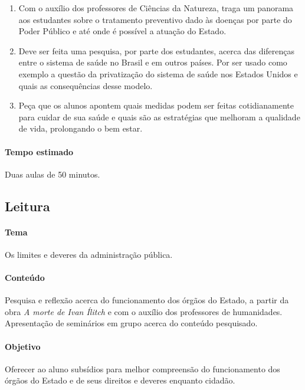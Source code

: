 \documentclass[12pt]{extarticle}
\begin{document}
\begin{enumerate}

\item Com o auxílio dos professores de Ciências da Natureza, traga
um panorama aos estudantes sobre o tratamento preventivo dado às doenças
por parte do Poder Público e até onde é possível a atuação do Estado.

\item Deve ser feita uma pesquisa, por parte dos estudantes,
acerca das diferenças entre o sistema de saúde no Brasil e em outros países.
Por ser usado como exemplo a questão da privatização do sistema de saúde nos Estados Unidos
e quais as consequências desse modelo.

\item Peça que os alunos apontem quais medidas podem ser feitas cotidianamente
para cuidar de sua saúde e quais são as estratégias que melhoram a qualidade de vida, 
prolongando o bem estar.

\end{enumerate}

\paragraph{Tempo estimado} Duas aulas de 50 minutos.


\subsection{Leitura}

\paragraph{Tema} Os limites e deveres da administração pública.

\paragraph{Conteúdo} Pesquisa e reflexão acerca do funcionamento dos órgãos do Estado,
a partir da obra \emph{A morte de Ivan Ílitch} e com o auxílio dos professores
de humanidades. Apresentação de seminários em grupo acerca do conteúdo pesquisado.

\paragraph{Objetivo} Oferecer ao aluno subsídios para melhor compreensão do
funcionamento dos órgãos do Estado e de seus direitos e deveres enquanto cidadão.
\end{document}
